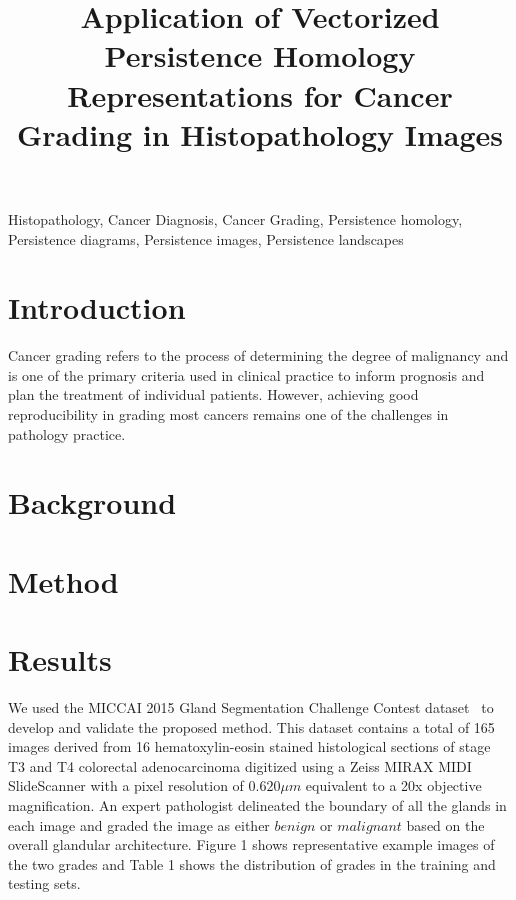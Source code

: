 \documentclass{article}
\title{Application of Vectorized Persistence Homology Representations for 
Cancer Grading in Histopathology Images}
\begin{document}
%
\maketitle
%
\begin{abstract}

\end{abstract}
%
\begin{keywords}
Histopathology, Cancer Diagnosis, Cancer Grading, Persistence homology, Persistence diagrams, Persistence images, Persistence landscapes
\end{keywords}
%
\section{Introduction}
\label{sec:intro}
Cancer grading refers to the process of determining the degree of malignancy and is one of the primary criteria used in clinical practice to inform prognosis and plan the treatment of individual patients. However, achieving good reproducibility in grading most cancers remains one of the challenges in pathology practice.

\section{Background}

\section{Method}


\section{Results}
We used the MICCAI 2015 Gland Segmentation Challenge Contest dataset~\cite{Sirinukunwattana2017GlandContest} to develop and validate the proposed method. This dataset contains a total of 165 images derived from 16 hematoxylin-eosin stained histological sections of stage T3 and T4 colorectal adenocarcinoma digitized using a Zeiss MIRAX MIDI SlideScanner with a pixel resolution of $0.620 \mu m$ equivalent to a 20x objective magnification. An expert pathologist delineated the boundary of all the glands in each image and graded the image as either $benign$ or $malignant$ based on the overall glandular architecture. Figure 1 shows representative example images of the two grades and Table 1 shows the distribution of grades in the training and testing sets.



\end{document}
